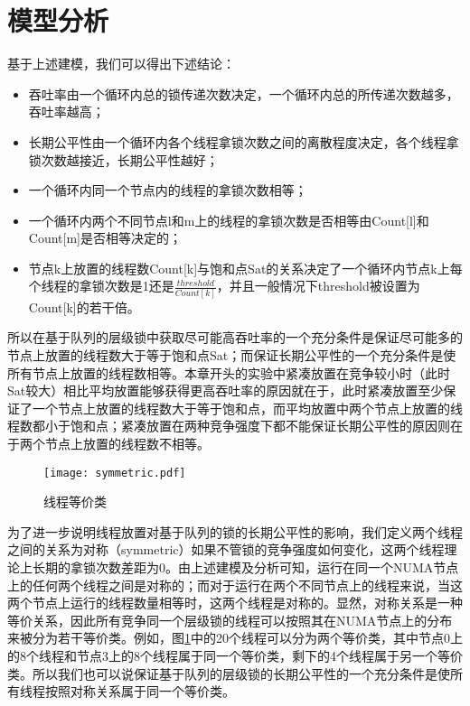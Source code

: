 \section{模型分析}
基于上述建模，我们可以得出下述结论：
\begin{itemize}
    \item 吞吐率由一个循环内总的锁传递次数决定，一个循环内总的所传递次数越多，吞吐率越高；
    \item 长期公平性由一个循环内各个线程拿锁次数之间的离散程度决定，各个线程拿锁次数越接近，长期公平性越好；
    \item 一个循环内同一个节点内的线程的拿锁次数相等；
    \item 一个循环内两个不同节点l和m上的线程的拿锁次数是否相等由Count[l]和Count[m]是否相等决定的；
    \item 节点k上放置的线程数Count[k]与饱和点Sat的关系决定了一个循环内节点k上每个线程的拿锁次数是1还是$\frac{threshold}{Count[k]}$，并且一般情况下threshold被设置为Count[k]的若干倍。
\end{itemize}
所以在基于队列的层级锁中获取尽可能高吞吐率的一个充分条件是保证尽可能多的节点上放置的线程数大于等于饱和点Sat；而保证长期公平性的一个充分条件是使所有节点上放置的线程数相等。本章开头的实验中紧凑放置在竞争较小时（此时Sat较大）相比平均放置能够获得更高吞吐率的原因就在于，此时紧凑放置至少保证了一个节点上放置的线程数大于等于饱和点，而平均放置中两个节点上放置的线程数都小于饱和点；紧凑放置在两种竞争强度下都不能保证长期公平性的原因则在于两个节点上放置的线程数不相等。

\begin{figure}[t]
	\centering
	\texttt{[image: symmetric.pdf]}
	\caption{线程等价类}
	\label{Fig:symmetric}
\end{figure}

为了进一步说明线程放置对基于队列的锁的长期公平性的影响，我们定义两个线程之间的关系为对称（symmetric）如果不管锁的竞争强度如何变化，这两个线程理论上长期的拿锁次数差距为0。由上述建模及分析可知，运行在同一个NUMA节点上的任何两个线程之间是对称的；而对于运行在两个不同节点上的线程来说，当这两个节点上运行的线程数量相等时，这两个线程是对称的。显然，对称关系是一种等价关系，因此所有竞争同一个层级锁的线程可以按照其在NUMA节点上的分布来被分为若干等价类。例如，图\ref{Fig:symmetric}中的20个线程可以分为两个等价类，其中节点0上的8个线程和节点3上的8个线程属于同一个等价类，剩下的4个线程属于另一个等价类。所以我们也可以说保证基于队列的层级锁的长期公平性的一个充分条件是使所有线程按照对称关系属于同一个等价类。

